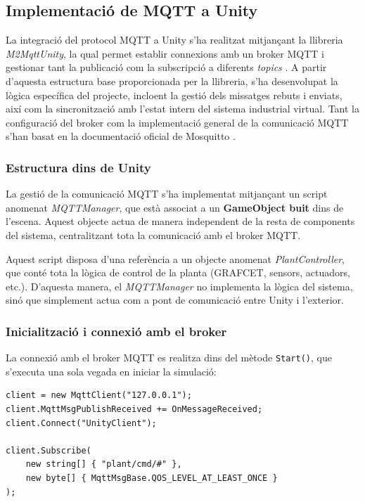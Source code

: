 \documentclass[a4paper,11pt,DIV=13,headings=normal,abstract=true,twoside=semi]{article}
\begin{document}
\subsection{Implementació de MQTT a Unity}

La integració del protocol MQTT a Unity s'ha realitzat mitjançant la llibreria \textit{M2MqttUnity}, la qual permet establir connexions amb un broker MQTT i gestionar tant la publicació com la subscripció a diferents \textit{topics} \cite{mqtt_unity_guide}. A partir d'aquesta estructura base proporcionada per la llibreria, s'ha desenvolupat la lògica específica del projecte, incloent la gestió dels missatges rebuts i enviats, així com la sincronització amb l'estat intern del sistema industrial virtual. Tant la configuració del broker com la implementació general de la comunicació MQTT s'han basat en la documentació oficial de Mosquitto \cite{mosquitto_download}.


\subsubsection*{Estructura dins de Unity}

La gestió de la comunicació MQTT s'ha implementat mitjançant un script anomenat \textit{MQTTManager}, que està associat a un \textbf{GameObject buit} \cite{UnityGameObjects} dins de l'escena. Aquest objecte actua de manera independent de la resta de components del sistema, centralitzant tota la comunicació amb el broker MQTT.

Aquest script disposa d'una referència a un objecte anomenat \textit{PlantController}, que conté tota la lògica de control de la planta (GRAFCET, sensors, actuadors, etc.). D'aquesta manera, el \textit{MQTTManager} no implementa la lògica del sistema, sinó que simplement actua com a pont de comunicació entre Unity i l'exterior.

\subsubsection*{Inicialització i connexió amb el broker}

La connexió amb el broker MQTT es realitza dins del mètode \texttt{Start()}, que s'executa una sola vegada en iniciar la simulació:

\begin{lstlisting}[style=simple]
client = new MqttClient("127.0.0.1");
client.MqttMsgPublishReceived += OnMessageReceived;
client.Connect("UnityClient");

client.Subscribe(
    new string[] { "plant/cmd/#" },
    new byte[] { MqttMsgBase.QOS_LEVEL_AT_LEAST_ONCE }
);
\end{lstlisting}
\end{document}
